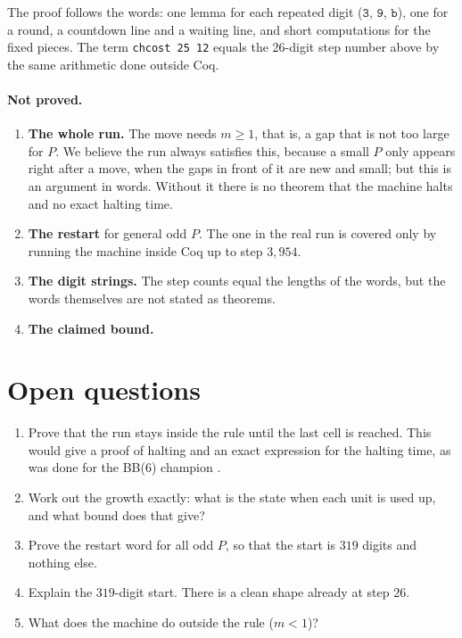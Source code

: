 \documentclass[11pt]{article}
\theoremstyle{remark}
\newcommand{\w}[1]{\mathtt{#1}}
\newcommand{\coq}[1]{\texttt{#1}}
\begin{document}
\noindent The proof follows the words: one lemma for each repeated digit
($\w3$, $\w9$, $\w{b}$), one for a round, a countdown line and a waiting line,
and short computations for the fixed pieces. The term \coq{chcost 25 12} equals
the 26-digit step number above by the same arithmetic done outside Coq.

\paragraph{Not proved.}
\begin{enumerate}
\item \textbf{The whole run.} The move needs $m\ge1$, that is, a gap that is
not too large for $P$. We believe the run always satisfies this, because a
small $P$ only appears right after a move, when the gaps in front of it are new
and small; but this is an argument in words. Without it there is no theorem
that the machine halts and no exact halting time.
\item \textbf{The restart} for general odd $P$. The one in the real run is
covered only by running the machine inside Coq up to step $3{,}954$.
\item \textbf{The digit strings.} The step counts equal the lengths of the
words, but the words themselves are not stated as theorems.
\item \textbf{The claimed bound.}
\end{enumerate}

\section{Open questions}

\begin{enumerate}
\item Prove that the run stays inside the rule until the last cell is reached.
This would give a proof of halting and an exact expression for the halting
time, as was done for the BB(6) champion \cite{bb6}.
\item Work out the growth exactly: what is the state when each unit is used
up, and what bound does that give?
\item Prove the restart word for all odd $P$, so that the start is $319$ digits
and nothing else.
\item Explain the $319$-digit start. There is a clean shape already at step
$26$.
\item What does the machine do outside the rule ($m<1$)?
\end{enumerate}
\end{document}
